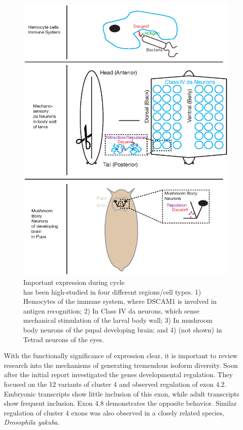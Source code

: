     \begin{figure} %
      \centering 
      \includegraphics{Figures/Intro/DscamAnatomy.eps}
      \caption[Important \dscam{} expression during \flies{} life cycle]
      {
        Important \dscam{} expression during \flies{} cycle\\[0.25cm]
        \dscam{} has been high-studied in four different regions/cell types. 1) Hemocytes of the immune system, where DSCAM1 is involved in antigen recognition; 2) In Class IV da neurons, which sense mechanical stimulation of the larval body wall; 3) In mushroom body neurons of the pupal developing brain; and 4) (not shown) in Tetrad neurons of the eyes.
        }
      \label{Intro:fig:DscamAnatomy}
      \end{figure}

    With the functionally significance of \dscam{} expression clear, it is important to review research into the mechanisms of generating tremendous isoform diversity. Soon after the initial \dscam{} report \citet{Celotto2001} investigated the genes developmental regulation. They focused on the 12 variants of cluster 4 and observed regulation of exon 4.2. Embryonic transcripts show little inclusion of this exon, while adult transcripts show frequent inclusion. Exon 4.8 demonstrates the opposite behavior. Similar regulation of cluster 4 exons was also observed in a closely related species, \textit{Drosophila yakuba}.

